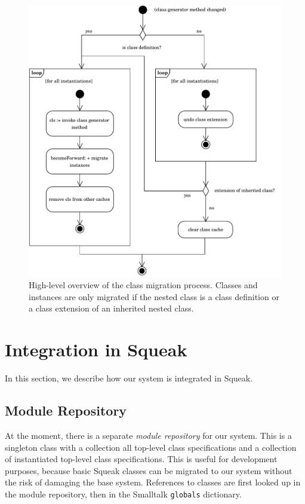 \begin{figure}[!htp]
	\centering
	\includegraphics[width=\textwidth]{update_cycle.pdf}
	\caption[Class migration process]{High-level overview of the class migration process. Classes and instances are only migrated if the nested class is a class definition or a class extension of an inherited nested class.}
	\label{fig:impl_update_cycle}
\end{figure}

\section{Integration in Squeak}
In this section, we describe how our system is integrated in Squeak.

\subsection{Module Repository}
At the moment, there is a separate \emph{module repository} for our system. This is a singleton class with a collection all top-level class specifications and a collection of instantiated top-level class specifications. This is useful for development purposes, because basic Squeak classes can be migrated to our system without the risk of damaging the base system. References to classes are first looked up in the module repository, then in the Smalltalk \texttt{globals} dictionary.

